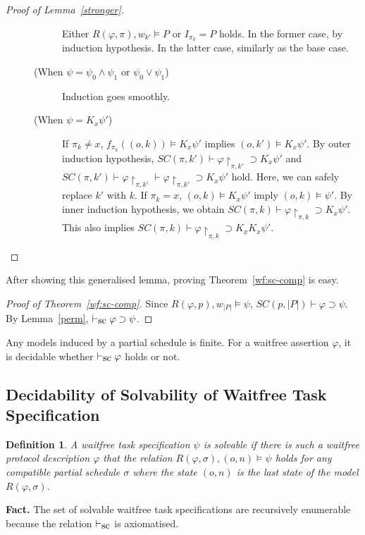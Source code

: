 \documentclass[doctor]{iscs-thesis}
\newcommand{\vdashsc}{\vdash_{\mbox{\rm sc}}}
\newtheorem{definition}{Definition}
\begin{document}
\begin{proof}[Proof of Lemma~\ref{stronger}]
\begin{description}
\begin{description}
 Either $R(\varphi, \pi), w_{k'}\models P$ or $I_{\pi_k}=P$ holds.
 In the former case, by induction hypothesis.
 In the latter case, similarly as the base case.
 \item[(When $\psi = \psi_0\wedge \psi_1$ or $\psi_0\vee\psi_1$)] 
 Induction goes smoothly.
 \item[(When $\psi = K_x\psi'$)] 
If $\pi_k\neq x$, $f_{\pi_k}((o,k))\models K_x\psi'$ implies $(o,k')\models K_x\psi'$.
	    By outer induction hypothesis, $SC(\pi,k')\vdash
	    \varphi\restriction_{\pi,k'}\supset K_x\psi'$ and
	    $SC(\pi,k')\vdash \varphi\restriction_{\pi,k'}\vdash
	    \varphi\restriction_{\pi,k'}\supset K_x\psi'$ hold.
	    Here, we can safely replace $k'$ with $k$.
	    If $\pi_k=x$, $(o,k)\models K_x\psi'$ imply
	    $(o,k)\models \psi'$.
	    By inner induction hypothesis, we obtain
	    $SC(\pi,k)\vdash\varphi\restriction_{\pi,k}\supset K_x\psi'$.
	    This also implies $SC(\pi,k)\vdash\varphi\restriction_{\pi,k}\supset K_xK_x\psi'$.
\end{description}
\end{description}
\end{proof}
After showing this generalised lemma, proving Theorem~\ref{wf:sc-comp} is
easy.
\begin{proof}[Proof of Theorem~\ref{wf:sc-comp}]
 Since $R(\varphi, p), w_{|P|}\models \psi$, $SC(p,|P|)\vdash \varphi\supset
 \psi$.
By Lemma~\ref{perm}, $\vdashsc
 \varphi\supset \psi$.
\end{proof}
Any models induced by a partial schedule is finite.  For a waitfree assertion $\varphi$,
it is decidable whether $\vdashsc \varphi$ holds or not.


\subsection{Decidability of Solvability of Waitfree Task Specification}

\begin{definition}
 A waitfree task specification $\psi$ is solvable if there is such a
 waitfree protocol description $\varphi$ that the relation
 $R(\varphi,\sigma), (o,n)\models\psi$ holds for any compatible partial
 schedule $\sigma$ where the state $(o,n)$ is the last state of the
 model $R(\varphi,\sigma)$.
\end{definition}

\noindent \textbf{Fact.} The set of solvable waitfree task specifications are
recursively enumerable because the relation $\vdashsc$ is axiomatised.
\end{document}
